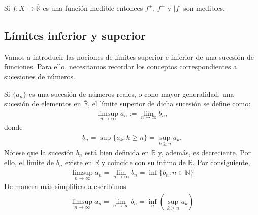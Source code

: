  \begin{cor}
 Si $f: X \longrightarrow \overline{\mathbb{R}}$ es una función medible entonces $f^+$, $f^-$ y $|f|$ son medibles.
 \end{cor}
 
 \subsection{Límites inferior y superior}
 
 Vamos a introducir las nociones de límites superior e inferior de una sucesión de funciones. Para ello, necesitamos recordar los conceptos correspondientes a sucesiones de números.
 
\begin{defi}
 Si $\{a_n\}$ es una sucesión de números reales, o cono mayor generalidad, una sucesión de elementos en $\overline{\mathbb{R}}$, el límite superior de dicha sucesión se define como:
\begin{align*}
     \limsup_{n \to \infty}{a_n} := \lim_{n \to \infty}{b_n},
\end{align*}
donde
\begin{align*}
     b_n = \sup{\{ a_k : k \ge n\}} = \sup_{k \ge n}{a_k}.
\end{align*}
Nótese que la sucesión $b_n$ está bien definida en $\overline{\mathbb{R}}$ y, además, es decreciente. Por ello, el límite de $b_n$ existe en $\overline{\mathbb{R}}$ y coincide con su ínfimo de $\overline{\mathbb{R}}$. Por consiguiente,
\begin{align*}
    \limsup_{n \to \infty}{a_n} = \lim_{n \to \infty}{b_n} = \inf{\{ b_n : n \in \mathbb{N}\}}
\end{align*}
De manera más simplificada escribimos
\begin{align*}
    \limsup_{n \to \infty}{a_n} = \lim_{n \to \infty}{b_n} = \inf_n{(\sup_{k \ge n}{a_k})}
\end{align*}
\end{defi}

